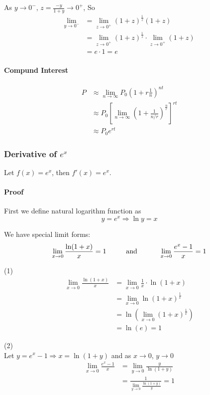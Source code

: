 \documentclass[12pt]{article}
\newcommand\tab[1][1cm]{\hspace*{#1}}
\begin{document}
\noindent
As $y \to 0^{-}$, $z = \frac{-y}{1 + y} \to 0^{+}$, So
\begin{align*} 
    \lim_{y \to 0^{-}} &= \lim_{z \to 0^{+}} (1 + z)^{\frac{1}{z}}(1 + z) \\
    &= \lim_{z \to 0^{+}} (1 + z)^{\frac{1}{z}} \cdot \lim_{z \to 0^{+}} (1 + z) \\
    &= e \cdot 1 = e
\end{align*}

\paragraph{Compund Interest} 
\begin{align*} 
    P &\approx \lim_{n \to \infty} P_0 \left( 1 + r \frac{1}{n}\right)^{nt} \\
    &\approx P_0 \left[\lim_{n \to \infty} \left( 1 + \frac{1}{n/r}\right)^{\frac{n}{r}} \right]^{rt} \\
    &\approx P_0 e^{rt}
\end{align*}

\subsubsection{Derivative of $e^x$}
Let $f(x) = e^x$, then $f'(x) = e^x$.
\paragraph{Proof} First we define natural logarithm function as 
\[
    y = e^x \Rightarrow \ln y = x    
\]

\noindent 
We have special limit forms:
\[
    \lim_{x \to 0} \frac{\ln(1 + x)}{x} = 1 \textrm{\tab and \tab} \lim_{x \to 0} \frac{e^x - 1}{x} = 1 
\]

(1)
\begin{align*} 
    \lim_{x \to 0} \frac{\ln(1 + x)}{x} &= \lim_{x \to 0} \frac{1}{x} \cdot {\ln(1 + x)} \\
    &= \lim_{x \to 0} \ln(1 + x)^{\frac{1}{x}} \\
    &= \ln(\lim_{x \to 0} (1 + x)^\frac{1}{x}) \\
    &= \ln(e) = 1
\end{align*}

(2)
\\


Let $y = e^x - 1 \Rightarrow  x = \ln(1 + y)$ and as $x \to 0$, $y \to 0$
\begin{align*} 
    \lim_{x \to 0} \frac{e^x - 1}{x} &= \lim_{y \to 0} \frac{y}{\ln(1 + y)} \\
    &= \frac{1}{\lim_{y \to 0} \frac{\ln(1 + y)}{y}} = 1
\end{align*}
\end{document}
